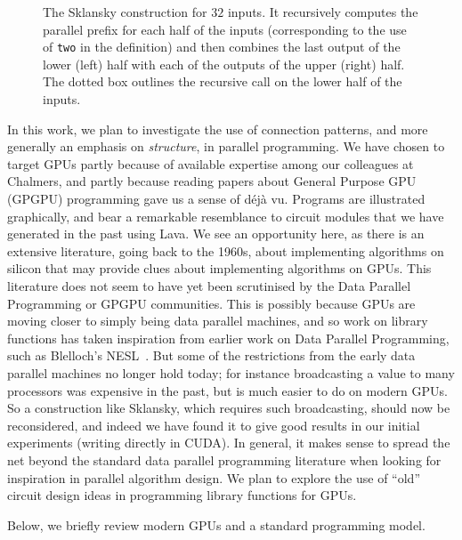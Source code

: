 \begin{figure}
\begin{center}
\caption{The Sklansky construction for $32$ inputs. 
It recursively computes the parallel prefix for each half of the inputs (corresponding to the use of {\tt two} in the definition) and then combines the last output of the lower (left) half with each of the outputs of the upper (right) half. The dotted box outlines the recursive call on the lower half of the inputs.}\label{fig:skl32}
\end{center}
\end{figure}

In this work, we plan to investigate the use of connection patterns, and more generally an emphasis on {\em structure}, in parallel programming.
We have chosen to target GPUs partly because of available expertise among our colleagues at Chalmers, and partly because reading papers about General Purpose GPU (GPGPU) programming gave us a sense of d{\'e}j\`a vu. Programs are illustrated graphically, and bear a remarkable resemblance to circuit modules that we have
generated in the past using Lava. We see an opportunity here, as there is an extensive literature, going back to the 1960s, about implementing algorithms on silicon that may provide clues
about implementing algorithms on GPUs. This literature does not seem to have yet been scrutinised by the Data Parallel Programming or GPGPU communities.
This is possibly because GPUs are moving closer to simply being data parallel machines, and so work on library functions has taken inspiration from earlier work on Data Parallel Programming, such as Blelloch's NESL~. But some of the restrictions from the early data parallel machines no longer hold today; for instance broadcasting a value to many processors was expensive in the past, but is much easier to do on modern GPUs. So a construction like Sklansky, which requires such broadcasting, should now be reconsidered, and indeed we have found it to give good results in our initial experiments (writing directly in CUDA). In general, it makes sense to spread the net beyond the standard data parallel programming literature when looking for inspiration in parallel algorithm design. We plan to explore the use of ``old'' circuit design ideas in programming library functions for GPUs.

Below, we briefly review modern GPUs and a standard programming model.





